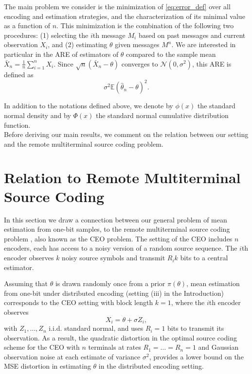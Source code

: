 \documentclass[letterpaper, conference]{IEEEtran}      %
\begin{document}
The main problem we consider is the minimization of \eqref{eq:error_def} over all encoding and estimation strategies, and the characterization of its minimal value as a function of  $n$. This minimization is the combination of the following two procedures: (1) selecting the $i$th message $M_i$ based on past messages and current observation $X_i$, and (2) estimating $\theta$ given messages $M^n$. We are interested in particular in the ARE of estimators of $\theta$ compared to the sample mean $\bar{X}_n = \frac{1}{n} \sum_{i=1}^n X_i$. Since $\sqrt{n}(\bar{X}_n-\theta)$ converges to $\mathcal N(0,\sigma^2)$, this ARE is defined as
\begin{equation}
{\sigma^2}  \mathbb E\left(\widehat{\theta}_n - \theta \right)^2. 
\label{eq:relative_efficiency}
\end{equation}

In addition to the notations defined above, we denote by $\phi(x)$ the standard normal density and by $\Phi(x)$ the standard normal cumulative distribution function. \\%


Before deriving our main results, we comment on the relation between our setting and the remote multiterminal source coding problem. 

\section{Relation to Remote Multiterminal Source Coding \label{sec:ceo}}
In this section we draw a connection between our general problem of mean estimation from one-bit samples, to the remote multiterminal source coding problem \cite{berger1996ceo}, also known as the CEO problem. The setting of the CEO includes $n$ encoders, each has access to a noisy version of a random source sequence. 
The $i$th encoder observes $k$ noisy source symbols and transmit $R_i k$ bits to a central estimator. \par
Assuming that $\theta$ is drawn randomly once from a prior $\pi(\theta)$, mean estimation from one-bit under distributed encoding (setting (iii) in the Introduction) corresponds to the CEO setting with block length $k=1$, where the $i$th encoder observes
\begin{equation}
\label{eq:Gaussian_channel}
X_i = \theta + \sigma Z_i,
\end{equation}
with $Z_1,\ldots,Z_n$ i.i.d. standard normal, and uses $R_i=1$ bits to transmit its observation. As a result, the quadratic distortion in the optimal source coding scheme for the CEO with $n$ terminals at rates $R_1 = \ldots = R_n = 1$ and Gaussian observation noise at each estimate of variance $\sigma^2$, provides a lower bound on the MSE distortion in estimating $\theta$ in the distributed encoding setting. 
 \\
\end{document}
